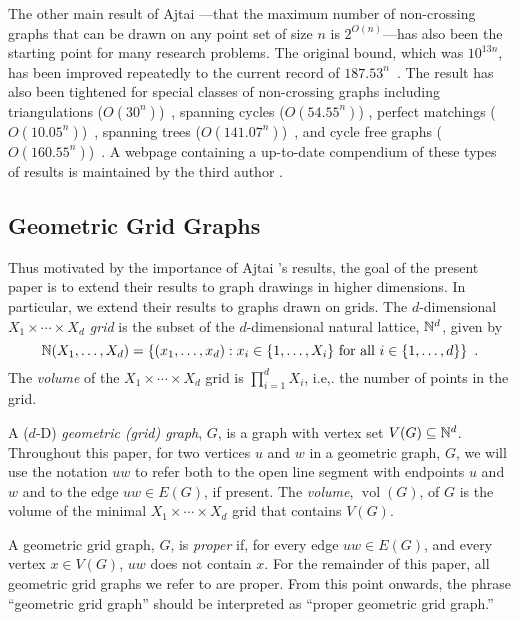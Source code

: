 \documentclass{patmorin}
\DeclareMathOperator{\volume}{vol}
\begin{document}
The other main result of Ajtai \etal---that the maximum number
of non-crossing graphs that can be drawn on any point set of
size $n$ is $2^{O(n)}$---has also been the starting point
for many research problems. The original bound, which was
$10^{13n}$, has been improved repeatedly to the current record of
$187.53^n$~\cite{sharir.sheffer:counting*1}.  The result has also
been tightened for special classes of non-crossing graphs including
triangulations ($O(30^n)$)~\cite{sharir.sheffer:counting}, spanning
cycles ($O(54.55^n)$) \cite{sharir.sheffer.ea:counting}, perfect
matchings ($O(10.05^n)$)~\cite{sharir.welzl:on}, spanning trees
($O(141.07^n)$)~\cite{hoffmann.sharir.ea:counting}, and cycle free graphs
($O(160.55^n)$)~\cite{hoffmann.sharir.ea:counting,sharir.sheffer:counting}.
A webpage containing a up-to-date compendium of these types of results
is maintained by the third author \cite{sheffer:numbers}.

\subsection{Geometric Grid Graphs}

Thus motivated by the importance of Ajtai \etal's results, the goal of
the present paper is to extend their results to graph drawings in higher
dimensions.  In particular, we extend their results to graphs drawn
on grids.  The $d$-dimensional \emph{$X_1\times\cdots\times X_d$ grid}
is the subset of the $d$-dimensional natural lattice, $\mathbb{N}^d$, given by
\[  \mathbb{N}(X_1,\ldots,X_d) = \{(x_1,\ldots,x_d): 
      \mbox{$x_i\in\{1,\ldots,X_i\}$ for all $i\in\{1,\ldots,d\}$}\}
	\enspace .\]
The \emph{volume} of the $X_1\times\cdots\times X_d$ grid is
$\prod_{i=1}^d X_i$, i.e,. the number of points in the grid.

A ($d$-D) \emph{geometric (grid) graph}, $G$, is a graph with vertex
set $V(G)\subseteq \mathbb{N}^d$.  Throughout this paper, for two vertices $u$
and $w$ in a geometric graph, $G$, we will use the notation $uw$ to
refer both to the open line segment with endpoints $u$ and $w$ and to
the edge $uw\in E(G)$, if present.    The \emph{volume}, $\volume(G)$,
of $G$ is the volume of the minimal $X_1\times\cdots\times X_d$ grid
that contains $V(G)$.

A geometric grid graph, $G$, is \emph{proper} if, for every edge $uw\in
E(G)$, and every vertex $x\in V(G)$, $uw$ does not contain $x$.  For the
remainder of this paper, all geometric grid graphs we refer to are proper.
From this point onwards, the phrase ``geometric grid graph'' should be
interpreted as ``proper geometric grid graph.''
\end{document}
